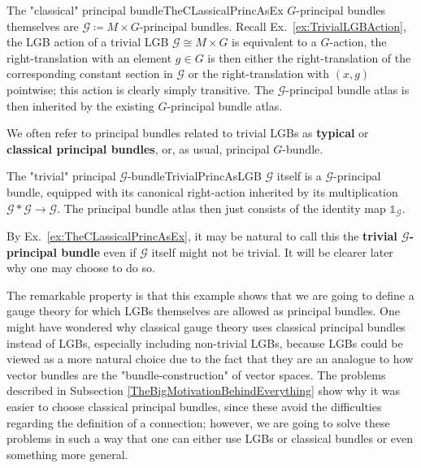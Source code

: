 \documentclass[a4paper,oneside,11pt,bibliography=totoc]{scrartcl}
\theoremstyle{plain}
\theoremstyle{remark}
\theoremstyle{definition}
\begin{document}
\begin{examples}{The "classical" principal bundle}{TheCLassicalPrincAsEx}
$G$-principal bundles themselves are $\mathcal{G} \coloneqq M \times G$-principal bundles. Recall Ex.\ \ref{ex:TrivialLGBAction}, the LGB action of a trivial LGB $\mathcal{G} \cong M \times G$ is equivalent to a $G$-action, the right-translation with an element $g \in G$ is then either the right-translation of the corresponding constant section in $\mathcal{G}$ or the right-translation with $(x, g)$ pointwise; this action is clearly simply transitive. The $\mathcal{G}$-principal bundle atlas is then inherited by the existing $G$-principal bundle atlas.

We often refer to principal bundles related to trivial LGBs as \textbf{typical} or \textbf{classical principal bundles}, or, as usual, principal $G$-bundle. 
\end{examples}

\begin{examples}{The "trivial" principal $\mathcal{G}$-bundle}{TrivialPrincAsLGB}
$\mathcal{G}$ itself is a $\mathcal{G}$-principal bundle, equipped with its canonical right-action inherited by its multiplication $\mathcal{G}*\mathcal{G} \to \mathcal{G}$. The principal bundle atlas then just consists of the identity map $\mathds{1}_{\mathcal{G}}$.

By Ex.\ \ref{ex:TheCLassicalPrincAsEx}, it may be natural to call this the \textbf{trivial $\mathcal{G}$-principal bundle} even if $\mathcal{G}$ itself might not be trivial. It will be clearer later why one may choose to do so.

The remarkable property is that this example shows that we are going to define a gauge theory for which LGBs themselves are allowed as principal bundles. One might have wondered why classical gauge theory uses classical principal bundles instead of LGBs, especially including non-trivial LGBs, because LGBs could be viewed as a more natural choice due to the fact that they are an analogue to how vector bundles are the "bundle-construction" of vector spaces. The problems described in Subsection \ref{TheBigMotivationBehindEverything} show why it was easier to choose classical principal bundles, since these avoid the difficulties regarding the definition of a connection; however, we are going to solve these problems in such a way that one can either use LGBs or classical bundles or even something more general.
\end{examples}
\end{document}
